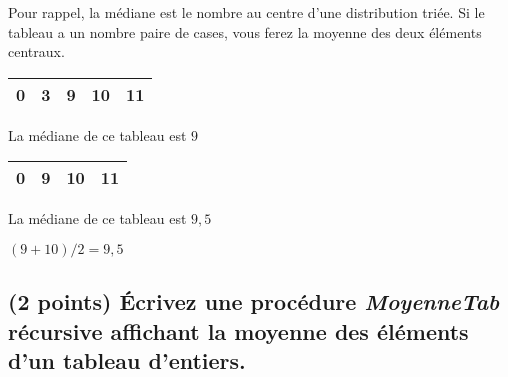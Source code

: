 \documentclass[11pt,a4paper]{article}
\begin{document}

Pour rappel, la médiane est le nombre au centre d'une distribution triée. Si le tableau a un nombre paire de cases, vous ferez la moyenne des deux éléments centraux.


\begin{table}[h!]
  \centering
  \begin{minipage}{0.4\textwidth}
    \centering
    \begin{tabular}{| c | c | c | c | c |}
      \hline
      0 & 3 & 9 & 10 & 11 \\
      \hline
    \end{tabular}

  \smallskip

  La médiane de ce tableau est $ 9 $
  \end{minipage}
    \hfillx
    \begin{minipage}{0.4\textwidth}
    \centering
    \begin{tabular}{| c | c | c | c |}
      \hline
      0 & 9 & 10 & 11 \\
      \hline
    \end{tabular}

  \smallskip

  La médiane de ce tableau est $ 9,5 $

  $ (9 + 10) / 2 = 9,5 $
  \end{minipage}
\end{table}

\begin{center}
\end{center}



\vfillLast
\newpage
\vfillFirst


\subsection{(2 points) \'Ecrivez une procédure \og \textit{MoyenneTab} \fg{} récursive affichant la moyenne des éléments d'un tableau d'entiers. }

\bigskip

\begin{center}
\end{center}
\end{document}

